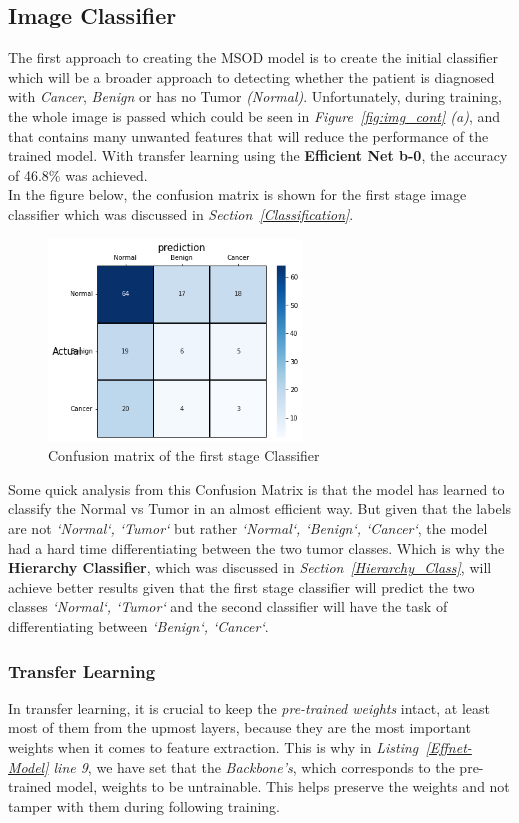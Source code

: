 \documentclass[12pt]{extarticle}
\begin{document}
	\subsection{Image Classifier}
	The first approach to creating the MSOD model is to create the initial classifier which will be a broader approach to detecting whether the patient is diagnosed with \emph{Cancer}, \emph{Benign} or has no Tumor \emph{(Normal)}. Unfortunately, during training, the whole image is passed which could be seen in \emph{Figure~\ref{fig:img_cont} (a)}, and that contains many unwanted features that will reduce the performance of the trained model. With transfer learning using the \textbf{Efficient Net b-0}, the accuracy of 46.8\% was achieved.\\
	In the figure below, the confusion matrix is shown for the first stage image classifier which was discussed in \emph{Section~\ref{Classification}}.
	\begin{figure}[h]
		\centering
		\includegraphics[width=0.6\textwidth]{pics/Figures/1st_stage_conf_matrix.png}
		\caption{\small{Confusion matrix of the first stage Classifier}}
		\label{fig:conf-mat-first}
	\end{figure}
	Some quick analysis from this Confusion Matrix is that the model has learned to classify the Normal vs Tumor in an almost efficient way. But given that the labels are not \emph{`Normal`, `Tumor`} but rather \emph{`Normal`, `Benign`, `Cancer`}, the model had a hard time differentiating between the two tumor classes. Which is why the \textbf{Hierarchy Classifier}, which was discussed in \emph{Section~\ref{Hierarchy_Class}}, will achieve better results given that the first stage classifier will predict the two classes \emph{`Normal`, `Tumor`} and the second classifier will have the task of differentiating between \emph{`Benign`, `Cancer`}.
	\subsubsection{Transfer Learning}
	In transfer learning, it is crucial to keep the \emph{pre-trained weights} intact, at least most of them from the upmost layers, because they are the most important weights when it comes to feature extraction. This is why in \emph{Listing~\ref{Effnet-Model} line 9}, we have set that the \emph{Backbone's}, which corresponds to the pre-trained model, weights to be untrainable. This helps preserve the weights and not tamper with them during following training.\\
	
\end{document}
